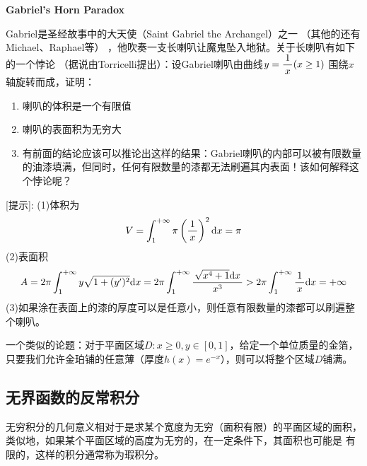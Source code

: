 \begin{shaded}
	{\bf Gabriel's Horn Paradox}
	
	\begin{center}
	\end{center}
	
	Gabriel是圣经故事中的大天使（Saint Gabriel the Archangel）之一
	（其他的还有Michael、Raphael等）
	，他吹奏一支长喇叭让魔鬼坠入地狱。关于长喇叭有如下的一个悖论
	（据说由Torricelli提出）：设Gabriel喇叭由曲线$y=\displaystyle\frac{\,{1}\,}{\,{x}\,}(x\geq 1)$
	围绕$x$轴旋转而成，证明：
	\begin{enumerate} [(1)]
  	  \setlength{\itemindent}{1cm}
	  \item 喇叭的体积是一个有限值
	  \item 喇叭的表面积为无穷大
	  \item 有前面的结论应该可以推论出这样的结果：Gabriel喇叭的内部可以被有限数量
	  的油漆填满，但同时，任何有限数量的漆都无法刷遍其内表面！该如何解释这个悖论呢？
	\end{enumerate}
	[提示]:
	(1)体积为
	$$V=\displaystyle\int_1^{+\infty}\pi\left(\displaystyle\frac{\,{1}\,}{\,{x}\,}\right)^2\mathrm{d} x=\pi$$
	(2)表面积
	$$A=2\pi\displaystyle\int_1^{+\infty}y\sqrt{1+(y')^2}\mathrm{d} x=2\pi\displaystyle\int_1^{+\infty}
	\displaystyle\frac{\,{\sqrt{x^4+1}\mathrm{d} x}\,}{\,{x^3}\,}>2\pi\displaystyle\int_1^{+\infty}\displaystyle\frac{\,{1}\,}{\,{x}\,}\mathrm{d} x=+\infty$$
	(3)如果涂在表面上的漆的厚度可以是任意小，则任意有限数量的漆都可以刷遍整个喇叭。
	
	一个类似的论题：对于平面区域$D:x\geq0,y\in[0,1]$，给定一个单位质量的金箔，
	只要我们允许金珀铺的任意薄（厚度$h(x)=e^{-x}$），则可以将整个区域$D$铺满。
\end{shaded}

\subsection{无界函数的反常积分}

无穷积分的几何意义相对于是求某个宽度为无穷（面积有限）的平面区域的面积，
类似地，如果某个平面区域的高度为无穷的，在一定条件下，其面积也可能是
有限的，这样的积分通常称为{\kaishu 瑕积分}。

